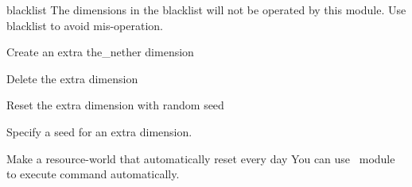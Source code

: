 \begin{Configuration}
    \item[blacklist]{
        The dimensions in the blacklist will not be operated by this module.
        Use blacklist to avoid mis-operation.
    }
\end{Configuration}

\begin{example}{Create an extra the\_nether dimension}
\end{example}

\begin{example}{Delete the extra dimension}
\end{example}

\begin{example}{Reset the extra dimension with random seed}
\end{example}

\begin{example}{Specify a seed for an extra dimension.}
    \\
\end{example}

\begin{tips}{Make a resource-world that automatically reset every day}
    You can use~ module to execute  command automatically.
\end{tips}